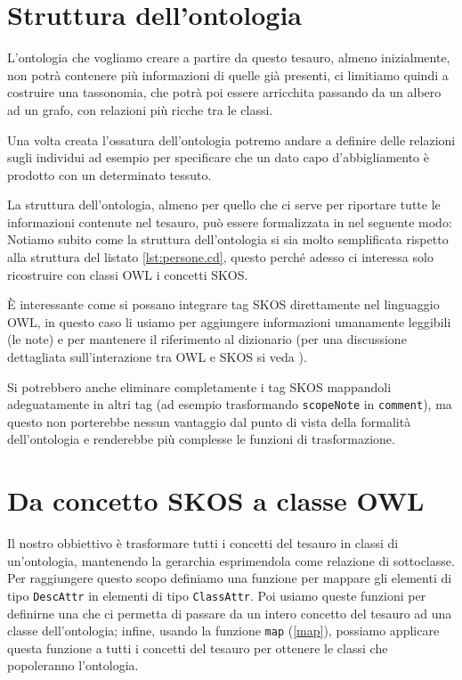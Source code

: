 \section{Struttura dell'ontologia}
L'ontologia che vogliamo creare a partire da questo tesauro, almeno inizialmente, non potrà contenere più informazioni di quelle già presenti, ci limitiamo quindi a costruire una tassonomia, che potrà poi essere arricchita passando da un albero ad un grafo, con relazioni più ricche tra le classi. 

Una volta creata l'ossatura dell'ontologia potremo andare a definire delle relazioni sugli individui ad esempio per specificare che un dato capo d'abbigliamento è prodotto con un determinato tessuto.

La struttura dell'ontologia, almeno per quello che ci serve per riportare tutte le informazioni contenute nel tesauro, può essere formalizzata in \cduce nel seguente modo:
Notiamo subito come la struttura dell'ontologia si sia molto semplificata rispetto alla struttura del listato \ref{lst:persone.cd}, questo perché adesso ci interessa solo ricostruire con classi OWL i concetti SKOS.

È interessante come si possano integrare tag SKOS direttamente nel linguaggio OWL, in questo caso li usiamo per aggiungere informazioni umanamente leggibili (le note) e per mantenere il riferimento al dizionario (per una discussione dettagliata sull'interazione tra OWL e SKOS si veda \cite{OWL&SKOS}).

Si potrebbero anche eliminare completamente i tag SKOS mappandoli adeguatamente in altri tag (ad esempio trasformando \verb|scopeNote| in \verb|comment|), ma questo non porterebbe nessun vantaggio dal punto di vista della formalità dell'ontologia e renderebbe più complesse le funzioni di trasformazione.

\section{Da concetto SKOS a classe OWL}
Il nostro obbiettivo è trasformare tutti i concetti del tesauro in classi di un'ontologia, mantenendo la gerarchia esprimendola come relazione di sottoclasse. Per raggiungere questo scopo definiamo una funzione per mappare gli elementi di tipo \verb|DescAttr| in elementi di tipo \verb|ClassAttr|. Poi usiamo queste funzioni per definirne una che ci permetta di passare da un intero concetto del tesauro ad una classe dell'ontologia; infine, usando la funzione \verb|map| (\ref{map}), possiamo applicare questa funzione a tutti i concetti del tesauro per ottenere le classi che popoleranno l'ontologia.
